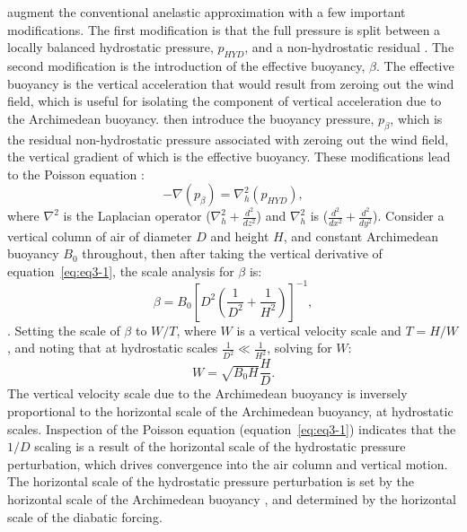\cite{JR2016QJRMS} augment the conventional anelastic approximation with a few important modifications. The first modification is that the full pressure is split between a locally balanced hydrostatic pressure, $p_{HYD}$, and a non-hydrostatic residual \citep{D1979JAS}. The second modification is the introduction of the effective buoyancy, $\beta$. The effective buoyancy is the vertical acceleration that would result from zeroing out the wind field, which is useful for isolating the component of vertical acceleration due to the Archimedean buoyancy. \cite{JR2016QJRMS} then introduce the buoyancy pressure, $p_{\beta}$, which is the residual non-hydrostatic pressure associated with zeroing out the wind field, the vertical gradient of which is the effective buoyancy. These modifications lead to the Poisson equation \citep[equation 8 in][]{JR2016QJRMS}:
\begin{equation}
-\nabla (p_{\beta}) = \nabla^{2}_{h} (p_{HYD}),\label{eq:eq3-1}
\end{equation} 
where $\nabla^2$ is the Laplacian operator ($\nabla^{2}_{h} + \frac{d^2}{dz^2}$) and $\nabla^{2}_{h}$ is ($\frac{d^2}{dx^2} + \frac{d^2}{dy^2}$). Consider a vertical column of air of diameter $D$ and height $H$, and constant Archimedean buoyancy $B_0$ throughout, then after taking the vertical derivative of equation~\ref{eq:eq3-1}, the scale analysis for $\beta$ is: 
\begin{equation}
\beta = B_0 \left[ D^2 \left( \frac{1}{D^2} + \frac{1}{H^2} \right) \right]^{-1},\label{eq:eq3-2}
\end{equation}
\citep[compare to equation 10 in][]{JR2016QJRMS}. Setting the scale of $\beta$ to $W/T$, where $W$ is a vertical velocity scale and $T=H/W$, and noting that at hydrostatic scales $\frac{1}{D^2}  \ll \frac{1}{H^2}$, solving for $W$:
\begin{equation}
W = \sqrt{B_0 H} \frac{H}{D}. \label{eq:eq3-3}
\end{equation}
The vertical velocity scale due to the Archimedean buoyancy is inversely proportional to the horizontal scale of the Archimedean buoyancy, at hydrostatic scales. Inspection of the Poisson equation (equation~\ref{eq:eq3-1}) indicates that the $1/D$ scaling is a result of the horizontal scale of the hydrostatic pressure perturbation, which drives convergence into the air column and vertical motion. The horizontal scale of the hydrostatic pressure perturbation is set by the horizontal scale of the Archimedean buoyancy \citep{JR2016QJRMS}, and determined by the horizontal scale of the diabatic forcing.

